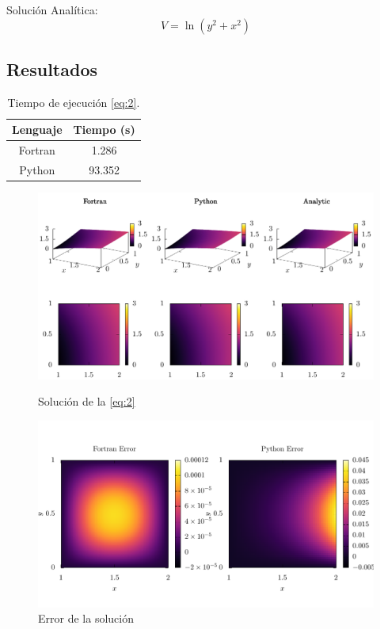 \documentclass[12pt,a4paper]{article}
\begin{document}
Solución Analítica:
\begin{equation}
  V = \ln{\left(y^2 + x^2\right)}
\end{equation}

\subsection*{Resultados}%
\label{sub:Resultados-2}

\begin{table}[htbp!]
  \centering
  \begin{tabular}{@{}c|S[table-format=2.3]@{}}
    \toprule
    Lenguaje  & {Tiempo (s)} \\
    \midrule
    Fortran & 1.286 \\
    Python & 93.352 \\
    \bottomrule
  \end{tabular}
  \caption{Tiempo de ejecución \cref{eq:2}.}
\end{table}

\begin{figure}[H]
  \centering
  \includegraphics[width=\textwidth]{./comparison-02.pdf}
  \caption{Solución de la \cref{eq:2}}
  \includegraphics[width=\textwidth]{./error-02.pdf}
  \caption{Error de la solución}
\end{figure}
\end{document}
